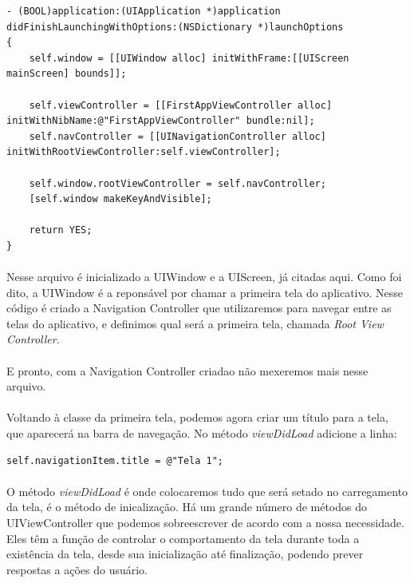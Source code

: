 \documentclass[a4paper,12pt,brazil,doubleside]{book}
\begin{document}
\begin{lstlisting}
- (BOOL)application:(UIApplication *)application didFinishLaunchingWithOptions:(NSDictionary *)launchOptions
{
    self.window = [[UIWindow alloc] initWithFrame:[[UIScreen mainScreen] bounds]];
    
    self.viewController = [[FirstAppViewController alloc] initWithNibName:@"FirstAppViewController" bundle:nil];
    self.navController = [[UINavigationController alloc] initWithRootViewController:self.viewController];
   
    self.window.rootViewController = self.navController;
    [self.window makeKeyAndVisible];
    
    return YES;
}
\end{lstlisting}

\paragraph{}Nesse arquivo é inicializado a UIWindow e a UIScreen, já citadas aqui. Como foi dito, a UIWindow é a reponsável por chamar a primeira tela do aplicativo. Nesse código é criado a Navigation Controller que utilizaremos para navegar entre as telas do aplicativo, e definimos qual será a primeira tela, chamada \emph{Root View Controller}.
\paragraph{}E pronto, com a Navigation Controller criadao não mexeremos mais nesse arquivo.\\

\paragraph{}Voltando à classe da primeira tela, podemos agora criar um título para a tela, que aparecerá na barra de navegação. No método \emph{viewDidLoad} adicione a linha:\\

\begin{lstlisting}
self.navigationItem.title = @"Tela 1";
\end{lstlisting}

\paragraph{}O método \emph{viewDidLoad} é onde colocaremos tudo que será setado no carregamento da tela, é o método de inicalização. Há um grande número de métodos do UIViewController que podemos sobreescrever de acordo com a nossa necessidade. Eles têm a função de controlar o comportamento da tela durante toda a existência da tela, desde sua inicialização até finalização, podendo prever respostas a ações do usuário.
\end{document}
